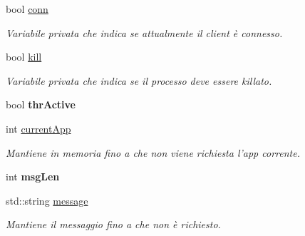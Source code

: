 \begin{DoxyCompactItemize}
\item 
\hypertarget{classServer_af6c0542f9031f20f71bb4a276dfbac64}{bool \hyperlink{classServer_af6c0542f9031f20f71bb4a276dfbac64}{conn}}\label{classServer_af6c0542f9031f20f71bb4a276dfbac64}

\begin{DoxyCompactList}\small\item\em \-Variabile privata che indica se attualmente il client è connesso. \end{DoxyCompactList}\item 
\hypertarget{classServer_a693131a2a6c6a5df3461fbdefa73b0b2}{bool \hyperlink{classServer_a693131a2a6c6a5df3461fbdefa73b0b2}{kill}}\label{classServer_a693131a2a6c6a5df3461fbdefa73b0b2}

\begin{DoxyCompactList}\small\item\em \-Variabile privata che indica se il processo deve essere killato. \end{DoxyCompactList}\item 
\hypertarget{classServer_a22159b3d42d81b9b3cbbdcc5795f547e}{bool {\bfseries thr\-Active}}\label{classServer_a22159b3d42d81b9b3cbbdcc5795f547e}

\item 
\hypertarget{classServer_af0575ea98923ea4c2ec76bb91e3a7701}{int \hyperlink{classServer_af0575ea98923ea4c2ec76bb91e3a7701}{current\-App}}\label{classServer_af0575ea98923ea4c2ec76bb91e3a7701}

\begin{DoxyCompactList}\small\item\em \-Mantiene in memoria fino a che non viene richiesta l'app corrente. \end{DoxyCompactList}\item 
\hypertarget{classServer_a17dd4df1c60d9cb28393faa091bc29b4}{int {\bfseries msg\-Len}}\label{classServer_a17dd4df1c60d9cb28393faa091bc29b4}

\item 
\hypertarget{classServer_a0493d162448907be150f830457808e51}{std\-::string \hyperlink{classServer_a0493d162448907be150f830457808e51}{message}}\label{classServer_a0493d162448907be150f830457808e51}

\begin{DoxyCompactList}\small\item\em \-Mantiene il messaggio fino a che non è richiesto. \end{DoxyCompactList}\end{DoxyCompactItemize}


